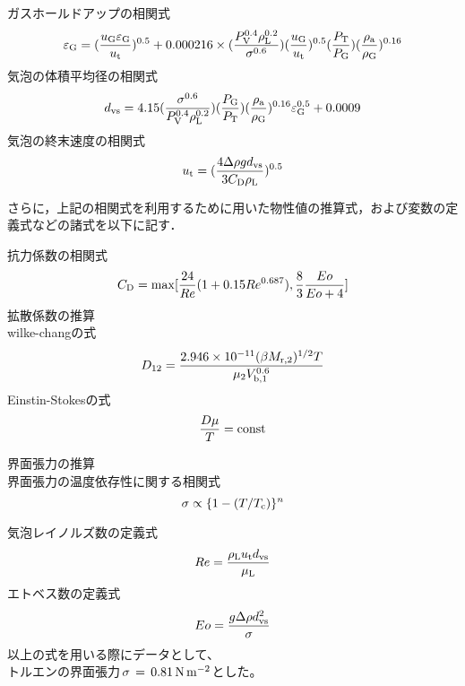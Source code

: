 \documentclass[a4j]{jsreport}
\begin{document}
ガスホールドアップの相関式
\begin{equation}
    \varepsilon_{{\rm G}} = (\frac{u_{{\rm G}}\varepsilon_{{\rm G}}}{u_{{\rm t}}}) ^{0.5} + 0.000216 \times(\frac{P_{{\rm V}}^{0.4} \rho_{{\rm L}}^{0.2} }{ \sigma^{0.6}})(\frac{u_{{\rm G}}}{u_{{\rm t}}})^{0.5}(\frac{P_{{\rm T}}}{P_{{\rm G}}})(\frac{\rho_{{\rm a}}}{\rho_{{\rm G}}})^{0.16}
\end{equation}
気泡の体積平均径の相関式
\begin{equation}
    d_{{\rm vs}} = 4.15 (\frac{\sigma^{0.6}}{P_{{\rm V}}^{0.4} \rho_{{\rm L}}^{0.2}})(\frac{P_{{\rm G}}}{P_{{\rm T}}})(\frac{\rho_{{\rm a}}}{\rho_{{\rm G}}})^{0.16} \varepsilon_{{\rm G}}^{0.5} + 0.0009
\end{equation}
気泡の終末速度の相関式
\begin{equation}
    u_{{\rm t}} = (\frac{4\Delta \rho g d_{{\rm vs}}}{3C_{{\rm D}}\rho_{{\rm L}}})^{0.5}
\end{equation}

さらに，上記の相関式を利用するために用いた物性値の推算式，および変数の定義式などの諸式を以下に記す．

抗力係数の相関式
\begin{equation}
    C_{{\rm D}} = {\rm max}[\frac{24}{Re}(1+0.15Re^{0.687}), \frac{8}{3}\frac{Eo}{Eo+4}]
\end{equation}
拡散係数の推算\\
wilke-changの式
\begin{equation}
    D_{12} = \frac{2.946\times 10^{-11}(\beta M_{{\rm r,2}})^{1/2} T} {\mu_2 V_{{\rm b,1}}^{0.6}}
\end{equation}
Einstin-Stokesの式
\begin{equation}
    \frac{D \mu}{T} = {\rm const}
\end{equation}

界面張力の推算\\
界面張力の温度依存性に関する相関式
\begin{equation}
    \sigma \propto \{1-(T/T_{{\rm c}}) \}^n
\end{equation}

気泡レイノルズ数の定義式
\begin{equation}
    Re = \frac{\rho_{{\rm L}}u_{{\rm t}}d_{{\rm vs}}}{\mu_{{\rm L}}}
\end{equation}
エトベス数の定義式
\begin{equation}
    Eo = \frac{g \Delta \rho d_{{\rm vs}}^2}{\sigma}
\end{equation}
以上の式を用いる際にデータとして、\\
トルエンの界面張力\,$\sigma\,=\,0.81\,{\rm N\,m^{-2}}$とした。
\end{document}
